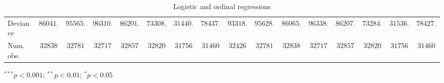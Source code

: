 \begin{table}
\begin{center}
\begin{threeparttable}
\begin{tabular}{l c c c c c c c c c c c c c c c}
Deviance                        & $86041.14$    & $95565.79$    & $96310.12$    & $86201.33$    & $73308.05$    & $31440.73$    & $78437.26$    & $93318.44$    & $95628.39$    & $86065.89$    & $96338.19$    & $86207.23$    & $73284.05$    & $31536.53$    & $78427.16$    \\
Num. obs.                       & $32838$       & $32781$       & $32717$       & $32857$       & $32820$       & $31756$       & $31460$       & $32426$       & $32781$       & $32838$       & $32717$       & $32857$       & $32820$       & $31756$       & $31460$       \\
\bottomrule
\end{tabular}
\begin{tablenotes}[flushleft]
\scriptsize{\item $^{***}p<0.001$; $^{**}p<0.01$; $^{*}p<0.05$}
\end{tablenotes}
\end{threeparttable}
\caption{Logistic and ordinal regressions}
\label{table:coefficients}
\end{center}
\end{table}
